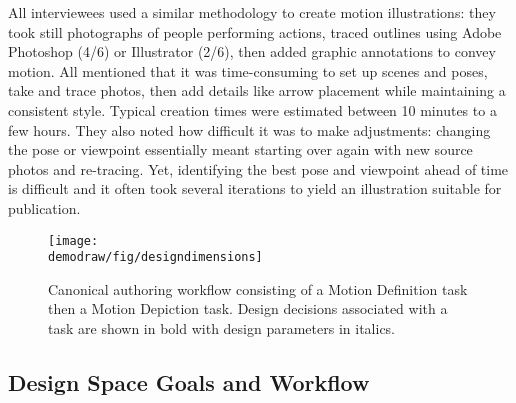 %
All interviewees used a similar methodology to create motion illustrations: they took still photographs of people performing actions, traced outlines using Adobe Photoshop (4/6) or Illustrator (2/6), then added graphic annotations to convey motion. %
%
All mentioned that it was time-consuming to set up scenes and poses, take and trace photos, then add details like arrow placement while maintaining a consistent style. Typical creation times were estimated between 10 minutes to a few hours.
They also noted how difficult it was to make adjustments: changing the pose or viewpoint essentially meant starting over again with new source photos and re-tracing.
Yet, identifying the best pose and viewpoint ahead of time is difficult and it often took several iterations to yield an illustration suitable for publication.

\begin{figure}[t]
  \centering
  \texttt{[image: \\demodraw/fig/designdimensions]}
  \caption{Canonical authoring workflow consisting of a Motion Definition task then a Motion Depiction task. Design decisions associated with a task are shown in bold with design parameters in italics.}
  \label{fig:designspace}
\end{figure}

\subsection{Design Space Goals and Workflow}

